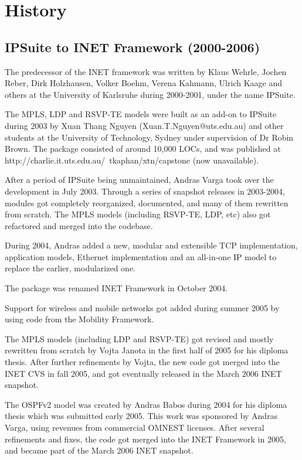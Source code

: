 \chapter{History}
\label{cha:History}

\section{IPSuite to INET Framework (2000-2006)}
\label{sec:history:ipsuite-to-inet}

The predecessor of the INET framework was written by Klaus
Wehrle, Jochen Reber, Dirk Holzhausen, Volker Boehm, Verena Kahmann,
Ulrich Kaage and others at the University of Karlsruhe during 2000-2001,
under the name IPSuite.

The MPLS, LDP and RSVP-TE models were built as an add-on to IPSuite
during 2003 by Xuan Thang Nguyen (Xuan.T.Nguyen@uts.edu.au) and other
students at the University of Technology, Sydney under supervision of
Dr Robin Brown. The package consisted of around 10,000 LOCs, and was
published at http://charlie.it.uts.edu.au/~tkaphan/xtn/capstone (now
unavailable).

After a period of IPSuite being unmaintained, Andras Varga took over
the development in July 2003. Through a series of snapshot releases in
2003-2004, modules got completely reorganized, documented, and many of them
rewritten from scratch. The MPLS models (including RSVP-TE, LDP, etc)
also got refactored and merged into the codebase.

During 2004, Andras added a new, modular and extensible TCP implementation,
application models, Ethernet implementation and an all-in-one IP model
to replace the earlier, modularized one.

The package was renamed INET Framework in October 2004.

Support for wireless and mobile networks got added during summer 2005
by using code from the Mobility Framework.

The MPLS models (including LDP and RSVP-TE) got revised and mostly
rewritten from scratch by Vojta Janota in the first half of 2005
for his diploma thesis. After further refinements by Vojta, the new code
got merged into the INET CVS in fall 2005, and got eventually released
in the March 2006 INET snapshot.

The OSPFv2 model was created by Andras Babos during 2004 for his diploma
thesis which was submitted early 2005. This work was sponsored by Andras Varga,
using revenues from commercial OMNEST licenses. After several refinements and fixes,
the code got merged into the INET Framework in 2005, and became part of the
March 2006 INET snapshot.

